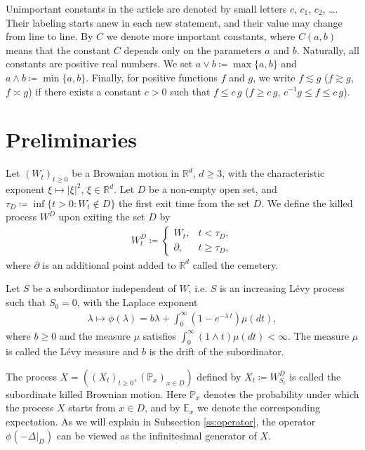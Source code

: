 \documentclass[12pt,a4paper,onecolumn]{amsart}
\theoremstyle{definition}
\newcommand{\R}{\mathbb{R}}
\newcommand{\p}{\mathbb{P}}
\newcommand{\ex}{\mathbb{E}}
\newcommand{\1}{\mathbf 1}
\newcommand{\Lo}{\phi(-\left.\Delta\right\vert_{D})}
\numberwithin{equation}{section}
\begin{document}
Unimportant constants in the article are denoted by small letters $c$, $c_1$, $c_2$, \dots. Their labeling starts anew in each new statement, and their value may change from line to line. By $C$ we denote more important constants, where $C(a,b)$ means that the constant $C$ depends only on the parameters $a$ and $b$. Naturally, all constants are positive real numbers. We set $a\vee b\coloneqq \max\{a,b\}$ and $a\wedge b \coloneqq \min \{a,b\}$. Finally, for positive functions $f$ and $g$, we write $f\lesssim g$ ($f\gtrsim g$, $f\asymp g$) if there exists a constant $c>0$ such that $f\le c\, g$ ($f\ge c \,g$, $c^{-1} g\le f \le c\,g$).


\section{Preliminaries}\label{s:prelims}
	Let $(W_t)_{t\ge0}$ be a Brownian motion in $\R^d$, $d\ge3$, with the characteristic exponent $\xi\mapsto |\xi|^2$, $\xi\in\R^d$. Let $D$ be a non-empty open set, and $\tau_D\coloneqq \inf\{t>0:W_t\notin D\}$ the first exit time from the set $D$. We define the killed process $W^D$ upon exiting the set $D$ by
\begin{align*}
	W^D_t\coloneqq\begin{cases}
		W_t,&t<\tau_D,\\
		\partial, &t\ge \tau_D,
	\end{cases}
\end{align*}
where $\partial$ is an additional point added to $\R^d$ called the cemetery.

Let $S$ be a subordinator independent of $W$, i.e. $S$ is an increasing L\'evy process such that $S_0=0$, with the Laplace exponent
\begin{align}\label{eq:Laplace exponent defn}
	\lambda\mapsto \phi(\lambda)=b\lambda+\int_{0}^\infty (1-e^{-\lambda\,t})\mu(dt),
\end{align}
where $b\ge0$ and the measure $\mu$ satisfies $\int_0^\infty (1\wedge t)\mu(dt)<\infty$. The measure $\mu$ is called the L\'evy measure and $b$ is the drift of the subordinator. 

The process $X=((X_t)_{t\ge0},(\p_x)_{x\in D})$ defined by $X_t\coloneqq W^D_{S_t}$ is called the subordinate killed Brownian motion. Here $\p_x$ denotes the probability under which the process $X$ starts from $x\in D$, and by $\ex_x$ we denote the corresponding expectation. As we will explain in Subsection \ref{ss:operator}, the operator $\Lo$ can be viewed as the infinitesimal generator of $X$.
\end{document}
